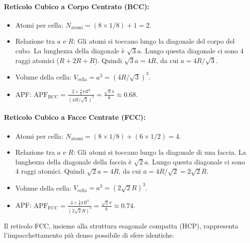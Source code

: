 \paragraph{Reticolo Cubico a Corpo Centrato (BCC):}
\begin{itemize}
    \item Atomi per cella: $N_{\text{atomi}} = (8 \times 1/8) + 1 = 2$.
    \item Relazione tra $a$ e $R$: Gli atomi si toccano lungo la diagonale del corpo del cubo. La lunghezza della diagonale è $\sqrt{3}a$. Lungo questa diagonale ci sono 4 raggi atomici ($R+2R+R$). Quindi $\sqrt{3}a = 4R$, da cui $a = 4R/\sqrt{3}$.
    \item Volume della cella: $V_{\text{cella}} = a^3 = (4R/\sqrt{3})^3$.
    \item APF: $\text{APF}_{\text{BCC}} = \frac{2 \times \frac{4}{3}\pi R^3}{(4R/\sqrt{3})^3} = \frac{\sqrt{3}\pi}{8} \approx 0.68$.
\end{itemize}

\paragraph{Reticolo Cubico a Facce Centrate (FCC):}
\begin{itemize}
    \item Atomi per cella: $N_{\text{atomi}} = (8 \times 1/8) + (6 \times 1/2) = 4$.
    \item Relazione tra $a$ e $R$: Gli atomi si toccano lungo la diagonale di una faccia. La lunghezza della diagonale della faccia è $\sqrt{2}a$. Lungo questa diagonale ci sono 4 raggi atomici. Quindi $\sqrt{2}a = 4R$, da cui $a = 4R/\sqrt{2} = 2\sqrt{2}R$.
    \item Volume della cella: $V_{\text{cella}} = a^3 = (2\sqrt{2}R)^3$.
    \item APF: $\text{APF}_{\text{FCC}} = \frac{4 \times \frac{4}{3}\pi R^3}{(2\sqrt{2}R)^3} = \frac{\sqrt{2}\pi}{6} \approx 0.74$.
\end{itemize}
Il reticolo FCC, insieme alla struttura esagonale compatta (HCP), rappresenta l'impacchettamento più denso possibile di sfere identiche.